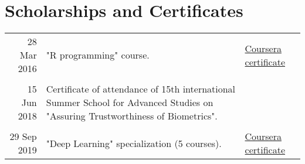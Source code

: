 \documentclass[a4paper,10pt]{article}
\begin{document}
\section{Scholarships and Certificates}
\begin{tabular}{r|p{8cm}l}
28 Mar 2016 & "R programming" course. & \href{https://www.coursera.org/account/accomplishments/certificate/WCGWD43MCTN2}{Coursera certificate}\\
\\
15 Jun 2018 & Certificate of attendance of 15th international Summer School for Advanced Studies on "Assuring Trustworthiness of Biometrics". & \\
\\

29 Sep 2019 & "Deep Learning" specialization (5 courses). & \href{https://www.coursera.org/account/accomplishments/specialization/JUG4WWN9PTD9}{Coursera certificate}
\end{tabular}
\end{document}
